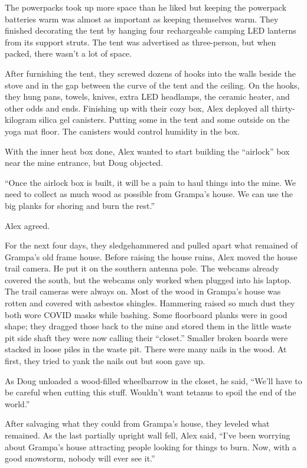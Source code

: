 The powerpacks took up more space than he liked but keeping the
powerpack batteries warm was almost as important as keeping themselves
warm. They finished decorating the tent by hanging four rechargeable
camping LED lanterns from its support struts. The tent was advertised as
three-person, but when packed, there wasn't a lot of space.

After furnishing the tent, they screwed dozens of hooks into the walls
beside the stove and in the gap between the curve of the tent and the
ceiling. On the hooks, they hung pans, towels, knives, extra LED
headlamps, the ceramic heater, and other odds and ends. Finishing up
with their cozy box, Alex deployed all thirty-kilogram silica gel
canisters. Putting some in the tent and some outside on the yoga mat
floor. The canisters would control humidity in the box.

With the inner heat box done, Alex wanted to start building the
``airlock'' box near the mine entrance, but Doug objected.

``Once the airlock box is built, it will be a pain to haul things into
the mine. We need to collect as much wood as possible from Grampa's
house. We can use the big planks for shoring and burn the rest.''

Alex agreed.

For the next four days, they sledgehammered and pulled apart what
remained of Grampa's old frame house. Before raising the house ruins,
Alex moved the house trail camera. He put it on the southern antenna
pole. The webcams already covered the south, but the webcams only worked
when plugged into his laptop. The trail cameras were always on. Most of
the wood in Grampa's house was rotten and covered with asbestos
shingles. Hammering raised so much dust they both wore COVID masks while
bashing. Some floorboard planks were in good shape; they dragged those
back to the mine and stored them in the little waste pit side shaft they
were now calling their ``closet.'' Smaller broken boards were stacked in
loose piles in the waste pit. There were many nails in the wood. At
first, they tried to yank the nails out but soon gave up.

As Doug unloaded a wood-filled wheelbarrow in the closet, he said,
``We'll have to be careful when cutting this stuff. Wouldn't want
tetanus to spoil the end of the world.''

After salvaging what they could from Grampa's house, they leveled what
remained. As the last partially upright wall fell, Alex said, ``I've
been worrying about Grampa's house attracting people looking for things
to burn. Now, with a good snowstorm, nobody will ever see it.''

